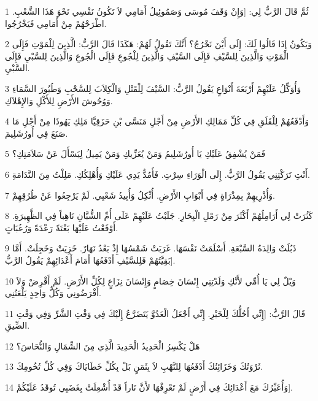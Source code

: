\par 1 ثُمَّ قَالَ الرَّبُّ لِي: [وَإِنْ وَقَفَ مُوسَى وَصَمُوئِيلُ أَمَامِي لاَ تَكُونُ نَفْسِي نَحْوَ هَذَا الشَّعْبِ. اطْرَحْهُمْ مِنْ أَمَامِي فَيَخْرُجُوا.
\par 2 وَيَكُونُ إِذَا قَالُوا لَكَ: إِلَى أَيْنَ نَخْرُجُ؟ أَنَّكَ تَقُولُ لَهُمْ: هَكَذَا قَالَ الرَّبُّ: الَّذِينَ لِلْمَوْتِ فَإِلَى الْمَوْتِ وَالَّذِينَ لِلسَّيْفِ فَإِلَى السَّيْفِ وَالَّذِينَ لِلْجُوعِ فَإِلَى الْجُوعِ وَالَّذِينَ لِلسَّبْيِ فَإِلَى السَّبْيِ.
\par 3 وَأُوَكِّلُ عَلَيْهِمْ أَرْبَعَةَ أَنْوَاعٍ يَقُولُ الرَّبُّ: السَّيْفَ لِلْقَتْلِ وَالْكِلاَبَ لِلسَّحْبِ وَطُيُورَ السَّمَاءِ وَوُحُوشَ الأَرْضِ لِلأَكْلِ وَالإِهْلاَكِ.
\par 4 وَأَدْفَعُهُمْ لِلْقَلَقِ فِي كُلِّ مَمَالِكِ الأَرْضِ مِنْ أَجْلِ مَنَسَّى بْنِ حَزَقِيَّا مَلِكِ يَهُوذَا مِنْ أَجْلِ مَا صَنَعَ فِي أُورُشَلِيمَ.
\par 5 فَمَنْ يُشْفِقُ عَلَيْكِ يَا أُورُشَلِيمُ وَمَنْ يُعَزِّيكِ وَمَنْ يَمِيلُ لِيَسْأَلَ عَنْ سَلاَمَتِكِ؟
\par 6 أَنْتِ تَرَكْتِنِي يَقُولُ الرَّبُّ. إِلَى الْوَرَاءِ سِرْتِ. فَأَمُدُّ يَدِي عَلَيْكِ وَأُهْلِكُكِ. مَلِلْتُ مِنَ النَّدَامَةِ.
\par 7 وَأُذْرِيهِمْ بِمِذْرَاةٍ فِي أَبْوَابِ الأَرْضِ. أُثْكِلُ وَأُبِيدُ شَعْبِي. لَمْ يَرْجِعُوا عَنْ طُرُقِهِمْ.
\par 8 كَثُرَتْ لِي أَرَامِلُهُمْ أَكْثَرَ مِنْ رَمْلِ الْبِحَارِ. جَلَبْتُ عَلَيْهِمْ عَلَى أُمِّ الشُّبَّانِ نَاهِباً فِي الظَّهِيرَةِ. أَوْقَعْتُ عَلَيْهَا بَغْتَةً رَعْدَةً وَرُعُبَاتٍ.
\par 9 ذَبُلَتْ وَالِدَةُ السَّبْعَةِ. أَسْلَمَتْ نَفْسَهَا. غَرَبَتْ شَمْسُهَا إِذْ بَعْدُ نَهَارٌ. خَزِيَتْ وَخَجِلَتْ. أَمَّا بَقِيَّتُهُمْ فَلِلسَّيْفِ أَدْفَعُهَا أَمَامَ أَعْدَائِهِمْ يَقُولُ الرَّبُّ].
\par 10 وَيْلٌ لِي يَا أُمِّي لأَنَّكِ وَلَدْتِنِي إِنْسَانَ خِصَامٍ وَإِنْسَانَ نِزَاعٍ لِكُلِّ الأَرْضِ. لَمْ أَقْرِضْ وَلاَ أَقْرَضُونِي وَكُلُّ وَاحِدٍ يَلْعَنُنِي.
\par 11 قَالَ الرَّبُّ: [إِنِّي أَحُلُّكَ لِلْخَيْرِ. إِنِّي أَجْعَلُ الْعَدُوَّ يَتَضَرَّعُ إِلَيْكَ فِي وَقْتِ الشَّرِّ وَفِي وَقْتِ الضِّيقِ.
\par 12 هَلْ يَكْسِرُ الْحَدِيدُ الْحَدِيدَ الَّذِي مِنَ الشِّمَالِ وَالنُّحَاسَ؟
\par 13 ثَرْوَتُكَ وَخَزَائِنُكَ أَدْفَعُهَا لِلنَّهْبِ لاَ بِثَمَنٍ بَلْ بِكُلِّ خَطَايَاكَ وَفِي كُلِّ تُخُومِكَ.
\par 14 وَأُعَبِّرُكَ مَعَ أَعْدَائِكَ فِي أَرْضٍ لَمْ تَعْرِفْهَا لأَنَّ نَاراً قَدْ أُشْعِلَتْ بِغَضَبِي تُوقَدُ عَلَيْكُمْ].
